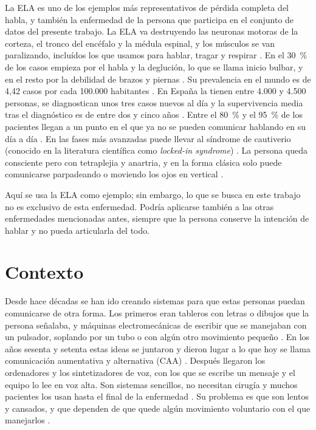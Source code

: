 La ELA es uno de los ejemplos más representativos de pérdida completa del habla, y también la enfermedad de la persona que participa en el conjunto de datos del presente trabajo. La ELA va destruyendo las neuronas motoras de la corteza, el tronco del encéfalo y la médula espinal, y los músculos se van paralizando, incluídos los que usamos para hablar, tragar y respirar \cite{beukelman2011}. En el \SI{30}{\percent} de los casos empieza por el habla y la deglución, lo que se llama inicio bulbar, y en el resto por la debilidad de brazos y piernas \cite{sen2026ela}. Su prevalencia en el mundo es de 4,42 casos por cada 100.000 habitantes \cite{xu2020als}. En España la tienen entre 4.000 y 4.500 personas, se diagnostican unos tres casos nuevos al día y la supervivencia media tras el diagnóstico es de entre dos y cinco años \cite{sen2026ela}. Entre el \SI{80}{\percent} y el \SI{95}{\percent} de los pacientes llegan a un punto en el que ya no se pueden comunicar hablando en su día a día \cite{beukelman2011}. En las fases más avanzadas puede llevar al síndrome de cautiverio (conocido en la literatura científica como \textit{locked-in syndrome}) \cite{silva2024speech}. La persona queda consciente pero con tetraplejia y anartria, y en la forma clásica solo puede comunicarse parpadeando o moviendo los ojos en vertical \cite{smith2005lis,bruno2011lis}.


Aquí se usa la ELA como ejemplo; sin embargo, lo que se busca en este trabajo no es exclusivo de esta enfermedad. Podría aplicarse también a las otras enfermedades mencionadas antes, siempre que la persona conserve la intención de hablar y no pueda articularla del todo.

\section{Contexto}
\label{sec:contexto}
\label{sec:brain-to-text}

Desde hace décadas se han ido creando sistemas para que estas personas puedan comunicarse de otra forma. Los primeros eran tableros con letras o dibujos que la persona señalaba, y máquinas electromecánicas de escribir que se manejaban con un pulsador, soplando por un tubo o con algún otro movimiento pequeño \cite{maling1963possum}. En los años sesenta y setenta estas ideas se juntaron y dieron lugar a lo que hoy se llama comunicación aumentativa y alternativa (CAA) \cite{vanderheiden2002}. Después llegaron los ordenadores y los sintetizadores de voz, con los que se escribe un mensaje y el equipo lo lee en voz alta. Son sistemas sencillos, no necesitan cirugía y muchos pacientes los usan hasta el final de la enfermedad \cite{beukelman2011}. Su problema es que son lentos y cansados, y que dependen de que quede algún movimiento voluntario con el que manejarlos \cite{silva2024speech}.


